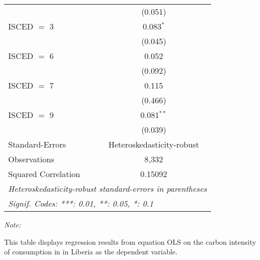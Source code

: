 \begin{table}[htbp!]
\begin{adjustbox}{width = 1\textwidth, max height = 0.95\textheight, center}
\begin{threeparttable}[b]
\begin{tabular}{lc}
                                & (0.051)\\   
            ISCED $=$ 3         & 0.083$^{*}$\\   
                                & (0.045)\\   
            ISCED $=$ 6         & 0.052\\   
                                & (0.092)\\   
            ISCED $=$ 7         & 0.115\\   
                                & (0.466)\\   
            ISCED $=$ 9         & 0.081$^{**}$\\   
                                & (0.039)\\   
            \midrule 
            Standard-Errors     & Heteroskedasticity-robust \\   
            Observations        & 8,332\\  
            Squared Correlation & 0.15092\\  
            \midrule \midrule
            \multicolumn{2}{l}{\emph{Heteroskedasticity-robust standard-errors in parentheses}}\\
            \multicolumn{2}{l}{\emph{Signif. Codes: ***: 0.01, **: 0.05, *: 0.1}}\\
         \end{tabular}
         
         \begin{tablenotes}\item \medskip \textit{Note:}
            \item This table displays regression results from equation OLS on the carbon intensity of consumption in  in Liberia as the dependent variable. 
         \end{tablenotes}
      \end{threeparttable}
   \end{adjustbox}
\end{table}


